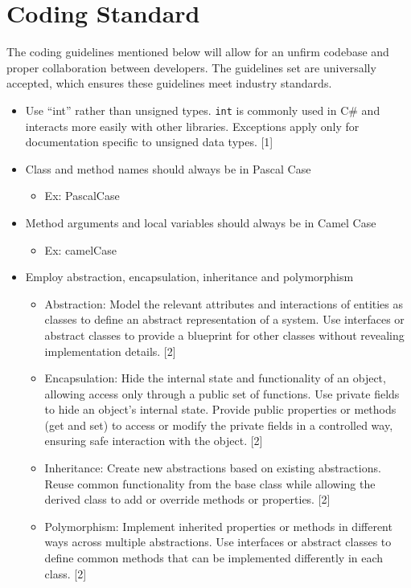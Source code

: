 \documentclass{article}
\begin{document}
\section{Coding Standard}


The coding guidelines mentioned below will allow for an unfirm codebase and proper collaboration between developers. The guidelines set are universally accepted, which ensures these guidelines meet industry standards.

\begin{itemize}

  \item Use ``int'' rather than unsigned types. \texttt{int} is commonly used in C\# and interacts more easily with other libraries. Exceptions apply only for documentation specific to unsigned data types. [1]
  \item Class and method names should always be in Pascal Case
  \begin{itemize}
    \item Ex: PascalCase
  \end{itemize}
  \item Method arguments and local variables should always be in Camel Case
  \begin{itemize}
    \item Ex: camelCase
  \end{itemize}
  \item Employ abstraction, encapsulation, inheritance and polymorphism

  \begin{itemize}
    \item Abstraction: Model the relevant attributes and interactions of entities as classes to define an abstract representation of a system. Use interfaces or abstract classes to provide a blueprint for other classes without revealing implementation details. [2]
    \item Encapsulation: Hide the internal state and functionality of an object, allowing access only through a public set of functions. Use private fields to hide an object's internal state. Provide public properties or methods (get and set) to access or modify the private fields in a controlled way, ensuring safe interaction with the object. [2]
    \item Inheritance: Create new abstractions based on existing abstractions. Reuse common functionality from the base class while allowing the derived class to add or override methods or properties. [2]
    \item Polymorphism: Implement inherited properties or methods in different ways across multiple abstractions. Use interfaces or abstract classes to define common methods that can be implemented differently in each class. [2]


\end{itemize}
\end{itemize}
\end{document}
